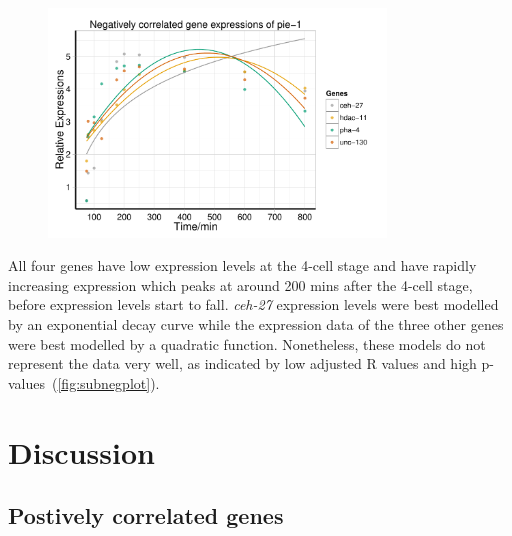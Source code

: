 \documentclass[11pt]{article}
\begin{document}
\begin{figure}[H]
  \centering
    \includegraphics[width=0.8\textwidth]{subnegplot.pdf}
  \label{fig:subnegplot}
\end{figure}

All four genes have low expression levels at the 4-cell stage and have rapidly increasing expression which peaks at around 200 mins after the 4-cell stage, before expression levels start to fall. \textit{ceh-27} expression levels were best modelled by an exponential decay curve while the expression data of the three other genes were best modelled by a quadratic function. Nonetheless, these models do not represent the data very well, as indicated by low adjusted R values and high p-values~(\autoref{fig:subnegplot}).

\section{Discussion}

\subsection{Postively correlated genes}
\end{document}
